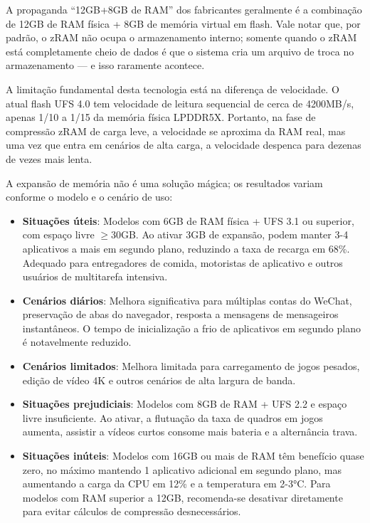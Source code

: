 A propaganda “12GB+8GB de RAM” dos fabricantes geralmente é a combinação de 12GB de RAM física + 8GB de memória virtual em flash. Vale notar que, por padrão, o zRAM não ocupa o armazenamento interno; somente quando o zRAM está completamente cheio de dados é que o sistema cria um arquivo de troca no armazenamento — e isso raramente acontece.


A limitação fundamental desta tecnologia está na diferença de velocidade. O atual flash UFS 4.0 tem velocidade de leitura sequencial de cerca de 4200MB/s, apenas 1/10 a 1/15 da memória física LPDDR5X. Portanto, na fase de compressão zRAM de carga leve, a velocidade se aproxima da RAM real, mas uma vez que entra em cenários de alta carga, a velocidade despenca para dezenas de vezes mais lenta.


A expansão de memória não é uma solução mágica; os resultados variam conforme o modelo e o cenário de uso:

\begin{itemize}
  \item \textbf{Situações úteis}: Modelos com 6GB de RAM física + UFS 3.1 ou superior, com espaço livre $\geq$30GB. Ao ativar 3GB de expansão, podem manter 3-4 aplicativos a mais em segundo plano, reduzindo a taxa de recarga em 68\%. Adequado para entregadores de comida, motoristas de aplicativo e outros usuários de multitarefa intensiva.
  \item \textbf{Cenários diários}: Melhora significativa para múltiplas contas do WeChat, preservação de abas do navegador, resposta a mensagens de mensageiros instantâneos. O tempo de inicialização a frio de aplicativos em segundo plano é notavelmente reduzido.
  \item \textbf{Cenários limitados}: Melhora limitada para carregamento de jogos pesados, edição de vídeo 4K e outros cenários de alta largura de banda.
  \item \textbf{Situações prejudiciais}: Modelos com 8GB de RAM + UFS 2.2 e espaço livre insuficiente. Ao ativar, a flutuação da taxa de quadros em jogos aumenta, assistir a vídeos curtos consome mais bateria e a alternância trava.
  \item \textbf{Situações inúteis}: Modelos com 16GB ou mais de RAM têm benefício quase zero, no máximo mantendo 1 aplicativo adicional em segundo plano, mas aumentando a carga da CPU em 12\% e a temperatura em 2-3°C. Para modelos com RAM superior a 12GB, recomenda-se desativar diretamente para evitar cálculos de compressão desnecessários.
\end{itemize}

